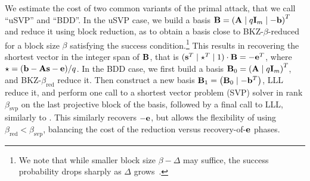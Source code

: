 We estimate the cost of two common variants of the primal attack, that we call ``uSVP'' and ``BDD''.
In the uSVP case, we build a basis $\mathbf{B} = \left( \mathbf{A} \mid q\mathbf{I}_m \mid -\mathbf{b} \right)^T$ and reduce it using block reduction, as to obtain a basis close to BKZ-$\beta$-reduced for a block size $\beta$ satisfying the \cite{USENIX:ADPS16} success condition.\footnote{We note that while smaller block size $\beta-\Delta$ may suffice, the success probability drops sharply as $\Delta$ grows~\cite{PKC:PosVir21}.}
This results in recovering the shortest vector in the integer span of $\mathbf{B}$, that is $(\mathbf{s}^T \mid \mathbf{\star}^T \mid 1) \cdot \mathbf{B} = - \mathbf{e}^T$, where $\mathbf{\star} = ( \mathbf{b} - \mathbf{A} \mathbf{s} - \mathbf{e} )/q$.
In the BDD case, we first build a basis $\mathbf{B}_0 = \left( \mathbf{A} \mid q\mathbf{I}_m \right)^T$, and BKZ-$\beta_\text{red}$ reduce it. Then construct a new basis $\mathbf{B}_1 = \left(\mathbf{B}_0 \mid -\mathbf{b}^T \right)$, LLL reduce it, and perform one call to a shortest vector problem (SVP) solver in rank $\beta_\text{svp}$ on the last projective block of the basis, followed by a final call to LLL, similarly to \cite{RSA:LiuNgu13}. This similarly recovers $-\mathbf{e}$, but allows the flexibility of using \mbox{$\beta_\text{red} < \beta_\text{svp}$}, balancing the cost of the reduction versus recovery-of-$\mathbf{e}$ phases.

